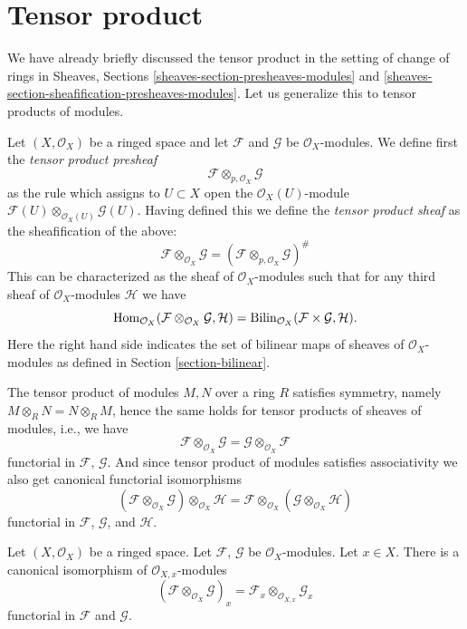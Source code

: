 \section{Tensor product}
\label{section-tensor-product}

\noindent
We have already briefly discussed the tensor product in the setting
of change of rings in Sheaves, Sections
\ref{sheaves-section-presheaves-modules} and
\ref{sheaves-section-sheafification-presheaves-modules}.
Let us generalize this to tensor products of modules.

\medskip\noindent
Let $(X, \mathcal{O}_X)$ be a ringed space and let
$\mathcal{F}$ and $\mathcal{G}$ be $\mathcal{O}_X$-modules.
We define first the {\it tensor product presheaf}
$$
\mathcal{F} \otimes_{p, \mathcal{O}_X} \mathcal{G}
$$
as the rule which assigns to $U \subset X$ open the
$\mathcal{O}_X(U)$-module
$\mathcal{F}(U) \otimes_{\mathcal{O}_X(U)} \mathcal{G}(U)$.
Having defined this we define the {\it tensor product sheaf}
as the sheafification of the above:
$$
\mathcal{F} \otimes_{\mathcal{O}_X} \mathcal{G}
=
(\mathcal{F} \otimes_{p, \mathcal{O}_X} \mathcal{G})^\#
$$
This can be characterized as the sheaf of
$\mathcal{O}_X$-modules such that for any third
sheaf of $\mathcal{O}_X$-modules $\mathcal{H}$
we have
$$
\mathop{\mathrm{Hom}}\nolimits_{\mathcal{O}_X}
(\mathcal{F} \otimes_{\mathcal{O}_X} \mathcal{G}, \mathcal{H})
=
\text{Bilin}_{\mathcal{O}_X}(\mathcal{F} \times \mathcal{G}, \mathcal{H}).
$$
Here the right hand side indicates the set of bilinear maps of sheaves
of $\mathcal{O}_X$-modules as defined in Section \ref{section-bilinear}.

\medskip\noindent
The tensor product of modules $M, N$ over a ring $R$ satisfies symmetry,
namely $M \otimes_R N = N \otimes_R M$, hence the same holds for
tensor products of sheaves of modules, i.e., we have
$$
\mathcal{F} \otimes_{\mathcal{O}_X} \mathcal{G}
=
\mathcal{G} \otimes_{\mathcal{O}_X} \mathcal{F}
$$
functorial in $\mathcal{F}$, $\mathcal{G}$.
And since tensor product of modules satisfies associativity we
also get canonical functorial isomorphisms
$$
(\mathcal{F} \otimes_{\mathcal{O}_X} \mathcal{G})
\otimes_{\mathcal{O}_X} \mathcal{H}
=
\mathcal{F} \otimes_{\mathcal{O}_X}
(\mathcal{G} \otimes_{\mathcal{O}_X} \mathcal{H})
$$
functorial in $\mathcal{F}$, $\mathcal{G}$, and $\mathcal{H}$.

\begin{lemma}
\label{lemma-stalk-tensor-product}
\begin{reference}
\cite[Chapter I, \S 1, no. 10, Proposition 8, pp. 205--206]{FAC}
\end{reference}
Let $(X, \mathcal{O}_X)$ be a ringed space.
Let $\mathcal{F}$, $\mathcal{G}$ be $\mathcal{O}_X$-modules.
Let $x \in X$. There is a canonical isomorphism
of $\mathcal{O}_{X, x}$-modules
$$
(\mathcal{F} \otimes_{\mathcal{O}_X} \mathcal{G})_x
=
\mathcal{F}_x \otimes_{\mathcal{O}_{X, x}} \mathcal{G}_x
$$
functorial in $\mathcal{F}$ and $\mathcal{G}$.
\end{lemma}

